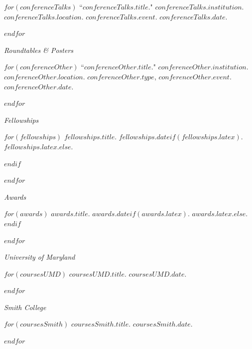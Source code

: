 \documentclass[11pt,article,oneside]{memoir}
\begin{document}
\smallskip

$for(conferenceTalks)$
\ind ``$conferenceTalks.title$." $conferenceTalks.institution$. $conferenceTalks.location$. \emph{$conferenceTalks.event$}. $conferenceTalks.date$. \normalsize

\smallskip
$endfor$
\medskip

\pagebreak[1]
\ind \emph{Roundtables \& Posters}

\smallskip

$for(conferenceOther)$
\ind ``$conferenceOther.title$." $conferenceOther.institution$. $conferenceOther.location$. $conferenceOther.type$, \emph{$conferenceOther.event$}. $conferenceOther.date$. \normalsize

\smallskip
$endfor$

\bigskip
\pagebreak[1]


\ind \emph{Fellowships}

\smallskip

$for(fellowships)$
\ind $fellowships.title$. $fellowships.date$$if(fellowships.latex)$. $fellowships.latex$.$else${.}

\smallskip
$endif$

$endfor$

\bigskip
\pagebreak[1]
\ind \emph{Awards}

\smallskip

$for(awards)$
\ind $awards.title$. $awards.date$$if(awards.latex)$. $awards.latex$.$else${.}$endif$

\smallskip
$endfor$

\bigskip


\ind \emph{University of Maryland}

\smallskip

$for(coursesUMD)$
\ind $coursesUMD.title$. $coursesUMD.date$.

\smallskip
$endfor$

\bigskip
\pagebreak[1]

\ind \emph{Smith College}

\smallskip

$for(coursesSmith)$
\ind $coursesSmith.title$. $coursesSmith.date$.

\smallskip
$endfor$

\bigskip
\pagebreak[1]
\end{document}
